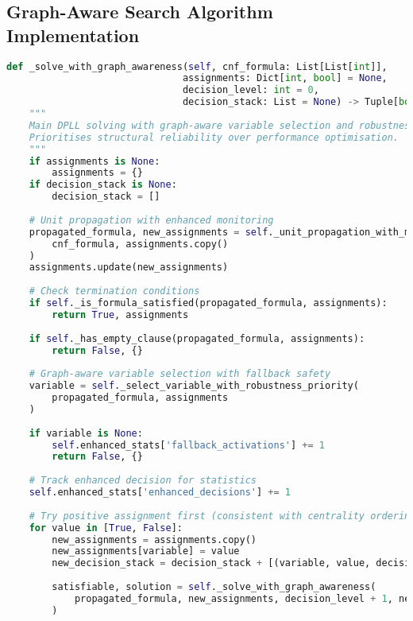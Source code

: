 
\subsection{Graph-Aware Search Algorithm Implementation}
\label{appendix:graph-aware-search}

\begin{lstlisting}[language=Python, caption=Graph-Aware Search Algorithm with Robustness Focus]
def _solve_with_graph_awareness(self, cnf_formula: List[List[int]], 
                               assignments: Dict[int, bool] = None,
                               decision_level: int = 0,
                               decision_stack: List = None) -> Tuple[bool, Dict[int, bool]]:
    """
    Main DPLL solving with graph-aware variable selection and robustness focus.
    Prioritises structural reliability over performance optimisation.
    """
    if assignments is None:
        assignments = {}
    if decision_stack is None:
        decision_stack = []
    
    # Unit propagation with enhanced monitoring
    propagated_formula, new_assignments = self._unit_propagation_with_monitoring(
        cnf_formula, assignments.copy()
    )
    assignments.update(new_assignments)
    
    # Check termination conditions
    if self._is_formula_satisfied(propagated_formula, assignments):
        return True, assignments
    
    if self._has_empty_clause(propagated_formula, assignments):
        return False, {}
    
    # Graph-aware variable selection with fallback safety
    variable = self._select_variable_with_robustness_priority(
        propagated_formula, assignments
    )
    
    if variable is None:
        self.enhanced_stats['fallback_activations'] += 1
        return False, {}
    
    # Track enhanced decision for statistics
    self.enhanced_stats['enhanced_decisions'] += 1
    
    # Try positive assignment first (consistent with centrality ordering)
    for value in [True, False]:
        new_assignments = assignments.copy()
        new_assignments[variable] = value
        new_decision_stack = decision_stack + [(variable, value, decision_level)]
        
        satisfiable, solution = self._solve_with_graph_awareness(
            propagated_formula, new_assignments, decision_level + 1, new_decision_stack
        )
        

\end{lstlisting}
